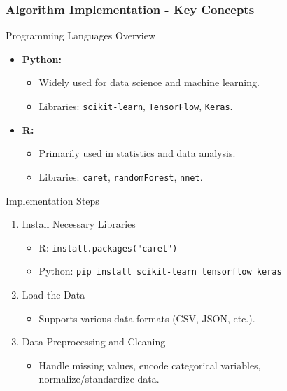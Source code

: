 \documentclass{beamer}
\begin{document}
\begin{frame}[fragile]
    \frametitle{Algorithm Implementation - Key Concepts}
    \begin{block}{Programming Languages Overview}
        \begin{itemize}
            \item \textbf{Python:}
            \begin{itemize}
                \item Widely used for data science and machine learning.
                \item Libraries: \texttt{scikit-learn}, \texttt{TensorFlow}, \texttt{Keras}.
            \end{itemize}
            \item \textbf{R:}
            \begin{itemize}
                \item Primarily used in statistics and data analysis.
                \item Libraries: \texttt{caret}, \texttt{randomForest}, \texttt{nnet}.
            \end{itemize}
        \end{itemize}
    \end{block}
    
    \begin{block}{Implementation Steps}
        \begin{enumerate}
            \item Install Necessary Libraries
                \begin{itemize}
                    \item R: \texttt{install.packages("caret")}
                    \item Python: \texttt{pip install scikit-learn tensorflow keras}
                \end{itemize}
            \item Load the Data
                \begin{itemize}
                    \item Supports various data formats (CSV, JSON, etc.).
                \end{itemize}
            \item Data Preprocessing and Cleaning
                \begin{itemize}
                    \item Handle missing values, encode categorical variables, normalize/standardize data.
                \end{itemize}
        \end{enumerate}
    \end{block}
\end{frame}
\end{document}
